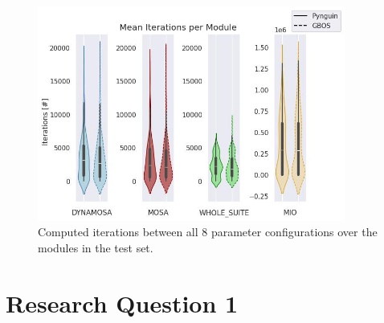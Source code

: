 \documentclass[%
  chapterprefix=false,%
  open=right,%
  twoside=true,%
  paper=a4,%
  logofile={Figures/logo.png},%
  thesistype=master,%
  UKenglish,%
]{se2thesis}
\begin{document}
\begin{figure}[th]
  \centering
  \includegraphics[width=0.9\textwidth]{Figures/Results/AlgorithmIterations.jpg}
  \caption{Computed iterations between all 8 parameter configurations over the modules in the test set.}\label{fig:iterations}
\end{figure}

\fi

\section{Research Question 1}
\end{document}
